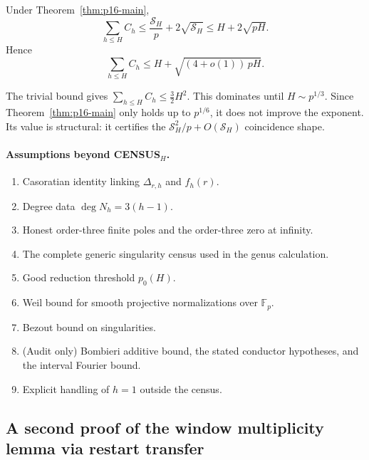\begin{proposition}\label{thm:p16-smallgap}
Under Theorem~\ref{thm:p16-main},
\[
 \sum_{h\le H}C_h
 \le\frac{\mathcal S_H}{p}+2\sqrt{\mathcal S_H}
 \le H+2\sqrt{pH}.
\]
Hence
\[
 \sum_{h\le H}C_h\le H+\sqrt{(4+o(1))\,pH}.
\]
\end{proposition}

\begin{remark}[limitation]\label{rem:p16-limitation}
The trivial bound gives $\sum_{h\le H}C_h\le\frac32H^2$.  This
dominates until $H\sim p^{1/3}$.  Since
Theorem~\ref{thm:p16-main} only holds up to $p^{1/6}$, it does not
improve the exponent.  Its value is structural: it certifies the
$\mathcal S_H^2/p+O(\mathcal S_H)$ coincidence shape.
\end{remark}

\paragraph{Assumptions beyond CENSUS$_H$.}
\begin{enumerate}
\item Casoratian identity linking $\Delta_{r,h}$ and $f_h(r)$.
\item Degree data $\deg N_h=3(h-1)$.
\item Honest order-three finite poles and the order-three zero at
infinity.
\item The complete generic singularity census used in the genus
calculation.
\item Good reduction threshold $p_0(H)$.
\item Weil bound for smooth projective normalizations over
$\mathbb F_p$.
\item Bezout bound on singularities.
\item (Audit only) Bombieri additive bound, the stated conductor
hypotheses, and the interval Fourier bound.
\item Explicit handling of $h=1$ outside the census.
\end{enumerate}

\subsection{A second proof of the window multiplicity lemma via restart
transfer}
\label{sec:br-second-proof}

